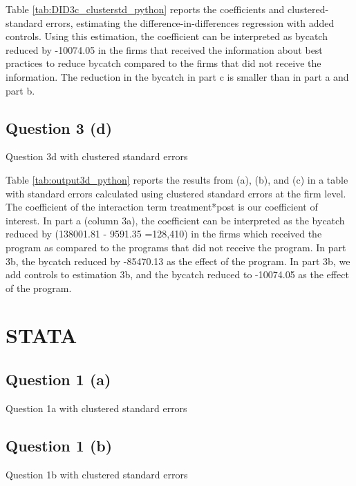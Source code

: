 \documentclass{article}
\begin{document}
Table \ref{tab:DID3c_clusterstd_python} reports the coefficients and clustered-standard errors, estimating the difference-in-differences regression with added controls. Using this estimation, the coefficient can be interpreted as bycatch reduced by  -10074.05 in the firms that received the information about best practices to reduce bycatch compared to the firms that did not receive the information. The reduction in the bycatch in part c is smaller than in part a and part b.

\newpage


\subsection{Question 3 (d)}
\begin{table}[ht]
    \centering
    
    \caption{Question 3d with clustered standard errors }
    \label{tab:output3d_python}
\end{table}

Table \ref{tab:output3d_python} reports the results from (a), (b), and (c) in a table with standard errors calculated using clustered standard errors at the firm level. The coefficient of the interaction term treatment*post is our coefficient of interest. In part a (column 3a), the coefficient can be interpreted as the bycatch reduced by (138001.81 - 9591.35 =128,410) in the firms which received the program as compared to the programs that did not receive the program. In part 3b, the bycatch reduced by -85470.13 as the effect of the program. In part 3b, we add controls to estimation 3b, and the bycatch reduced to -10074.05 as the effect of the program.

\newpage

\section{STATA}

\subsection{Question 1 (a)}
\begin{table}[ht]
    \centering
    
    \caption{Question 1a with clustered standard errors }
    \label{tab:q1a_cluster_stata}
\end{table}

\subsection{Question 1 (b)}
\begin{table}[ht]
    \centering
    
    \caption{Question 1b with clustered standard errors }
    \label{tab:q1b_cluster_stata}
\end{table}
\end{document}
